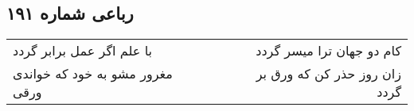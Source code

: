 \begin{center}
\section*{رباعی شماره ۱۹۱}
\label{sec:sh191}
\begin{longtable}{l p{0.5cm} r}
با علم اگر عمل برابر گردد
&&
کام دو جهان ترا میسر گردد
\\
مغرور مشو به خود که خواندی ورقی
&&
زان روز حذر کن که ورق بر گردد
\\
\end{longtable}
\end{center}
